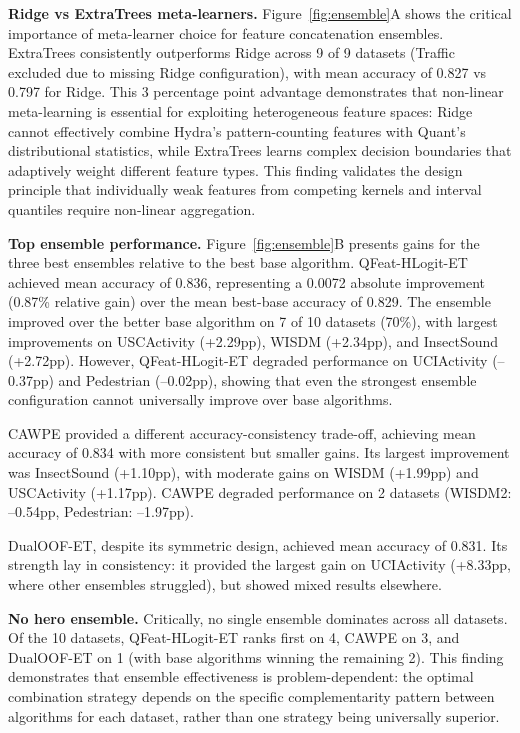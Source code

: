 \documentclass[pdflatex,sn-basic]{sn-jnl}           %
\theoremstyle{thmstyleone}%
\theoremstyle{thmstyletwo}%
\theoremstyle{thmstylethree}%
\begin{document}
\textbf{Ridge vs ExtraTrees meta-learners.} Figure~\ref{fig:ensemble}A shows the critical importance of meta-learner choice for feature concatenation ensembles. ExtraTrees consistently outperforms Ridge across 9 of 9 datasets (Traffic excluded due to missing Ridge configuration), with mean accuracy of 0.827 vs 0.797 for Ridge. This 3 percentage point advantage demonstrates that non-linear meta-learning is essential for exploiting heterogeneous feature spaces: Ridge cannot effectively combine Hydra's pattern-counting features with Quant's distributional statistics, while ExtraTrees learns complex decision boundaries that adaptively weight different feature types. This finding validates the design principle that individually weak features from competing kernels and interval quantiles require non-linear aggregation.

\textbf{Top ensemble performance.} Figure~\ref{fig:ensemble}B presents gains for the three best ensembles relative to the best base algorithm. QFeat-HLogit-ET achieved mean accuracy of 0.836, representing a 0.0072 absolute improvement (0.87\% relative gain) over the mean best-base accuracy of 0.829. The ensemble improved over the better base algorithm on 7 of 10 datasets (70\%), with largest improvements on USCActivity (+2.29pp), WISDM (+2.34pp), and InsectSound (+2.72pp). However, QFeat-HLogit-ET degraded performance on UCIActivity (--0.37pp) and Pedestrian (--0.02pp), showing that even the strongest ensemble configuration cannot universally improve over base algorithms.

CAWPE provided a different accuracy-consistency trade-off, achieving mean accuracy of 0.834 with more consistent but smaller gains. Its largest improvement was InsectSound (+1.10pp), with moderate gains on WISDM (+1.99pp) and USCActivity (+1.17pp). CAWPE degraded performance on 2 datasets (WISDM2: --0.54pp, Pedestrian: --1.97pp).

DualOOF-ET, despite its symmetric design, achieved mean accuracy of 0.831. Its strength lay in consistency: it provided the largest gain on UCIActivity (+8.33pp, where other ensembles struggled), but showed mixed results elsewhere.

\textbf{No hero ensemble.} Critically, no single ensemble dominates across all datasets. Of the 10 datasets, QFeat-HLogit-ET ranks first on 4, CAWPE on 3, and DualOOF-ET on 1 (with base algorithms winning the remaining 2). This finding demonstrates that ensemble effectiveness is problem-dependent: the optimal combination strategy depends on the specific complementarity pattern between algorithms for each dataset, rather than one strategy being universally superior.
\end{document}
